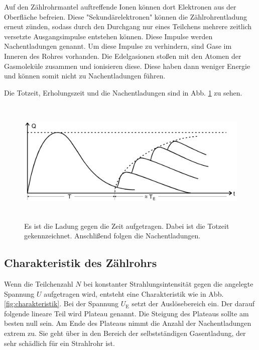 \noindent Auf den Zählrohrmantel auftreffende Ionen können dort Elektronen aus der Oberfläche befreien. Diese "Sekundärelektronen" können die Zählrohrentladung erneut zünden, sodass durch den Durchgang nur eines Teilchens mehrere zeitlich versetzte Ausgangsimpulse entstehen können. 
Diese Impulse werden Nachentladungen genannt. 
Um diese Impulse zu verhindern, sind Gase im Inneren des Rohres vorhanden. Die Edelgasionen stoßen mit den Atomen der Gasmoleküle zusammen und ionisieren diese. Diese haben dann weniger Energie und können somit nicht zu Nachentladungen führen. 

\noindent Die Totzeit, Erholungszeit und die Nachentladungen sind in Abb. \ref{fig:totzeit} zu sehen.

\begin{figure}
    \centering
    \includegraphics[width=12cm, height=6cm]{build/totzeit.png}
    \caption{Es ist die Ladung gegen die Zeit aufgetragen. Dabei ist die Totzeit gekennzeichnet. Anschlißend folgen die Nachentladungen. \cite{V703}}
    \label{fig:totzeit}
\end{figure}


\subsection{Charakteristik des Zählrohrs}

Wenn die Teilchenzahl $N$ bei konstanter Strahlungsintensität gegen die angelegte Spannung $U$ aufgetragen wird, entsteht eine Charakteristik wie in Abb. \ref{fig:charakteristik}. Bei der Spannung $U_\text{E}$ setzt der Auslösebereich ein. Der darauf folgende lineare Teil wird Plateau genannt. Die Steigung des Plateaus sollte am besten null sein. Am Ende des Plateaus nimmt die Anzahl der Nachentladungen extrem zu. Sie geht über in den Bereich der selbstständigen Gasentladung, der sehr schädlich für ein Strahlrohr ist.

